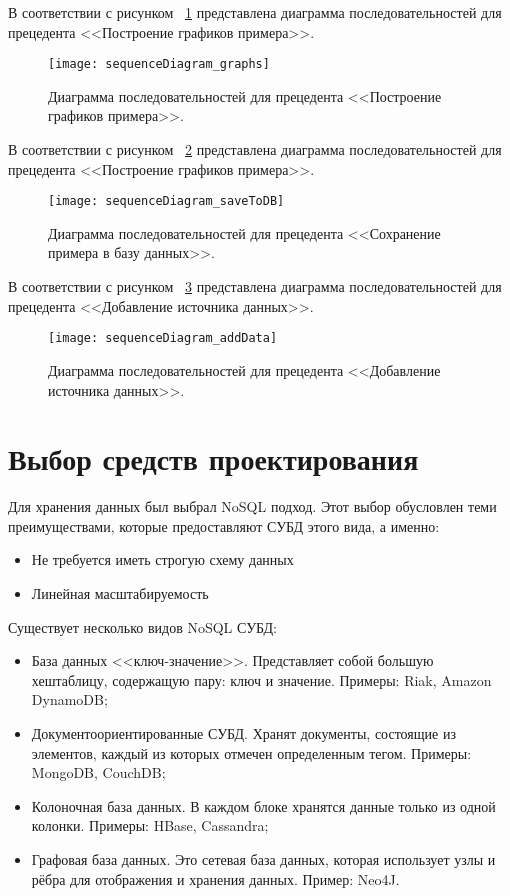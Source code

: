 \documentclass[14pt]{extreport}
\begin{document}
В соответствии с рисунком ~\ref{fig9} представлена диаграмма последовательностей для прецедента <<Построение графиков примера>>.

\begin{figure}[H]
\centerline{\texttt{[image: sequenceDiagram\_graphs]}}
\caption{Диаграмма последовательностей для прецедента <<Построение графиков примера>>.}
\label{fig9}
\end{figure}

В соответствии с рисунком ~\ref{fig10} представлена диаграмма последовательностей для прецедента <<Построение графиков примера>>.

\begin{figure}[H]
\centerline{\texttt{[image: sequenceDiagram\_saveToDB]}}
\caption{Диаграмма последовательностей для прецедента <<Сохранение примера в базу данных>>.}
\label{fig10}
\end{figure}

В соответствии с рисунком ~\ref{fig11} представлена диаграмма последовательностей для прецедента <<Добавление источника данных>>.

\begin{figure}[H]
\centerline{\texttt{[image: sequenceDiagram\_addData]}}
\caption{Диаграмма последовательностей для прецедента <<Добавление источника 
данных>>.}
\label{fig11}
\end{figure}

\chapter{Выбор средств проектирования}

Для хранения данных был выбрал NoSQL подход. Этот выбор обусловлен теми преимуществами, которые предоставляют СУБД этого вида, а именно:
\begin{itemize}
\item Не требуется иметь строгую схему данных
\item Линейная масштабируемость
\end{itemize}

Существует несколько видов NoSQL СУБД:
\begin{itemize}
\item База данных <<ключ-значение>>. Представляет собой большую хештаблицу, содержащую пару: ключ и значение. Примеры: Riak, Amazon DynamoDB;
\item Документоориентированные СУБД. Хранят документы, состоящие из
элементов, каждый из которых отмечен определенным тегом. Примеры: MongoDB, CouchDB;
\item Колоночная база данных. В каждом блоке хранятся данные только из
одной колонки. Примеры: HBase, Cassandra;
\item Графовая база данных. Это сетевая база данных, которая использует
узлы и рёбра для отображения и хранения данных. Пример: Neo4J.
\end{itemize}
\end{document}
